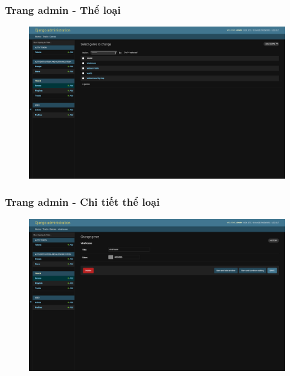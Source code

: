 \documentclass[a4paper]{article}
\begin{document}
\subsubsection{Trang admin - Thể loại}
\begin{figure}[h!]
\begin{center}
\includegraphics[width=12cm]{admin_genres.png}
\end{center}
\end{figure}

\subsubsection{Trang admin - Chi tiết thể loại}
\begin{figure}[h!]
\begin{center}
\includegraphics[width=12cm]{admin_genres_detail.png}
\end{center}
\end{figure}
\newpage
\end{document}
